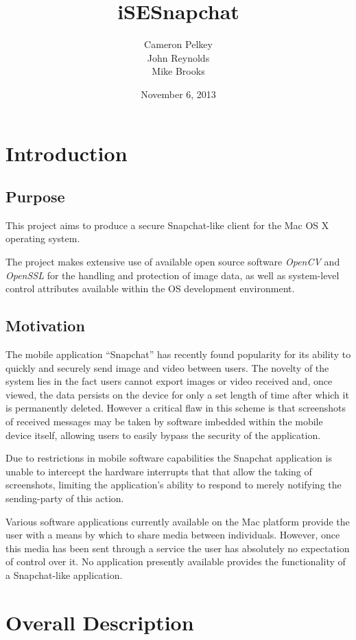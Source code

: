 \documentclass[11pt, a4paper,titlepage]{report}
\title{iSESnapchat}
\author{Cameron Pelkey\\John Reynolds\\Mike Brooks}
\date{November 6, 2013}
\begin{document}
\maketitle


\chapter{Introduction}
\section{Purpose}
This project aims to produce a secure Snapchat-like client for the Mac OS X operating system.

The project makes extensive use of available open source software \emph{OpenCV} \cite{software:opencv} and \emph{OpenSSL} \cite{software:openssl} for the handling and protection of image data, as well as system-level control attributes available within the OS development environment.

\section{Motivation}
The mobile application ``Snapchat'' has recently found popularity for its ability to quickly and securely send image and video between users. The novelty of the system lies in the fact users cannot export images or video received and, once viewed, the data persists on the device for only a set length of time after which it is permanently deleted. However a critical flaw in this scheme is that screenshots of received messages may be taken by software imbedded within the mobile device itself, allowing users to easily bypass the security of the application.

Due to restrictions in mobile software capabilities the Snapchat application is unable to intercept the hardware interrupts that that allow the taking of screenshots, limiting the application's ability to respond to merely notifying the sending-party of this action.

Various software applications currently available on the Mac platform provide the user with a means by which to share media between individuals. However, once this media has been sent through a service the user has absolutely no expectation of control over it. No application presently available provides the functionality of a Snapchat-like application.


\chapter{Overall Description}
\end{document}
